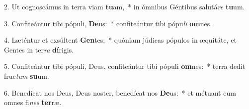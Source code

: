 2. Ut cognoscámus in terra viam \textbf{tu}am,~*  in ómnibus Géntibus salutá\textit{re} \textbf{tu}um.\

3. Confiteántur tibi pópuli, \textbf{De}us:~*  confiteántur tibi pópu\textit{li} \textbf{om}nes.\

4. Læténtur et exsúltent \textbf{Gen}tes:~*  quóniam júdicas pópulos in æquitáte, et Gentes in ter\textit{ra} \textbf{dí}rigis.\

5. Confiteántur tibi pópuli, Deus, confiteántur tibi pópuli \textbf{om}nes:~*  terra dedit fruc\textit{tum} \textbf{su}um.\

6. Benedícat nos Deus, Deus noster, benedícat nos \textbf{De}us:~*  et métuant eum omnes fi\textit{nes} \textbf{ter}ræ.\

